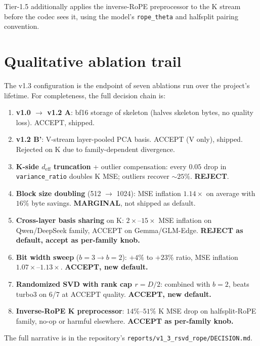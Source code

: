 \documentclass[11pt,a4paper]{article}
\theoremstyle{definition}
\theoremstyle{plain}
\begin{document}
Tier-1.5 additionally applies the inverse-RoPE preprocessor to the K stream before the codec sees it, using the model's \texttt{rope\_theta} and halfsplit pairing convention.

\section{Qualitative ablation trail}
\label{app:ablation}

The v1.3 configuration is the endpoint of seven ablations run over the project's lifetime. For completeness, the full decision chain is:
\begin{enumerate}[leftmargin=*]
  \item \textbf{v1.0 $\to$ v1.2 A}: bf16 storage of skeleton (halves skeleton bytes, no quality loss). ACCEPT, shipped.
  \item \textbf{v1.2 B'}: V-stream layer-pooled PCA basis. ACCEPT (V only), shipped. Rejected on K due to family-dependent divergence.
  \item \textbf{K-side $d_{\text{eff}}$ truncation} + outlier compensation: every $0.05$ drop in \texttt{variance\_ratio} doubles K MSE; outliers recover $\sim 25\%$. \textbf{REJECT}.
  \item \textbf{Block size doubling} (512 $\to$ 1024): MSE inflation $1.14\times$ on average with $16\%$ byte savings. \textbf{MARGINAL}, not shipped as default.
  \item \textbf{Cross-layer basis sharing} on K: $2\times$--$15\times$ MSE inflation on Qwen/DeepSeek family, ACCEPT on Gemma/GLM-Edge. \textbf{REJECT as default, accept as per-family knob.}
  \item \textbf{Bit width sweep} ($b=3 \to b=2$): $+4\%$ to $+23\%$ ratio, MSE inflation $1.07\times$--$1.13\times$. \textbf{ACCEPT, new default.}
  \item \textbf{Randomized SVD with rank cap $r = D/2$}: combined with $b=2$, beats turbo3 on 6/7 at ACCEPT quality. \textbf{ACCEPT, new default.}
  \item \textbf{Inverse-RoPE K preprocessor}: $14\%$--$51\%$ K MSE drop on halfsplit-RoPE family, no-op or harmful elsewhere. \textbf{ACCEPT as per-family knob.}
\end{enumerate}
The full narrative is in the repository's \verb|reports/v1_3_rsvd_rope/DECISION.md|.
\end{document}

